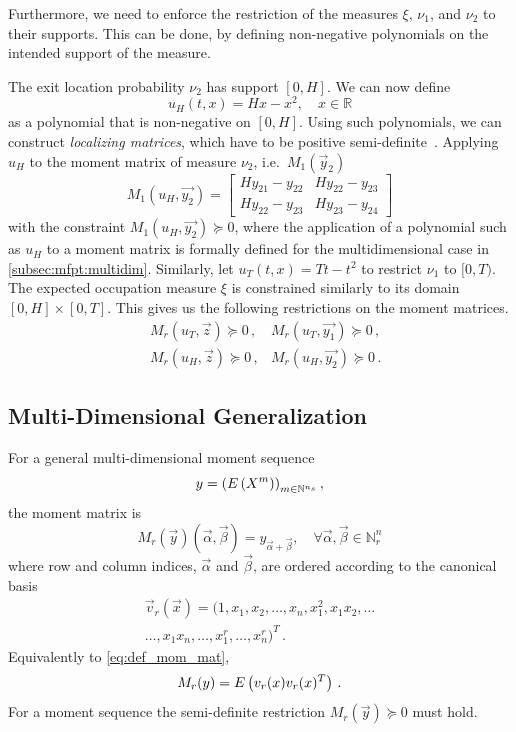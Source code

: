 Furthermore, we need to enforce the restriction of the measures
$\xi$, $\nu_1$, and $\nu_2$
to their supports.
This can be done, by defining non-negative polynomials
on the intended support of the measure.
\begin{example}
  The exit location probability $\nu_2$ has support $[0,H]$. We can now define
  \[
    u_H(t,x) = Hx - x^2, \quad x\in \mathbb R
  \]
  as a polynomial that is non-negative on $[0,H]$.
  Using such polynomials, we can construct \emph{localizing matrices},
  which have to be positive semi-definite~\parencite{lasserre2010moments}.
  Applying $u_H$ to the moment matrix of measure $\nu_2$, i.e.\ $M_1(\vec{y}_2)$
  \[
    M_1(u_H, \vec{y_2})=
    \begin{bmatrix}
      Hy_{21} - y_{22} & Hy_{22} - y_{23} \\
      Hy_{22} - y_{23} & Hy_{23} - y_{24}
    \end{bmatrix}
  \]
  with the constraint $M_1(u_H, \vec{y_2})\succeq 0$, where the application of
  a polynomial such as $u_H$ to a moment matrix
  is formally defined for the multidimensional case in
  \autoref{subsec:mfpt:multidim}.
  Similarly, let $u_T(t, x) = Tt-t^2$ to restrict $\nu_1$ to $[0,T)$.
  The expected occupation measure $\xi$ is constrained similarly to its domain
  $[0,H]\times[0,T]$.
  This gives us the following restrictions on the moment matrices.
  \begin{equation}\label{eq:localizing_sd_constraints}
    \begin{split}
      & M_r(u_T,\vec{z})\succeq 0\,, &M_r(u_T,\vec{y_1})\succeq 0\,,\\
      & M_r(u_H,\vec{z})\succeq 0\,, &M_r(u_H,\vec{y_2})\succeq 0\,.
    \end{split}
  \end{equation}
\end{example}

\subsection{Multi-Dimensional Generalization}
\label{subsec:mfpt:multidim}
For a general multi-dimensional moment sequence
\[
  y={\left({E}\left(X^{m}\right)\right)}_{m\in\mathbb{N}^{n_s}}\,,
\]
the moment
matrix is~\parencite{lasserre2010moments}
\begin{equation}\label{eq:def_mom_mat}
  M_r(\vec y)(\vec\alpha,\vec\beta)
  =y_{\vec\alpha + \vec\beta},\quad\forall\vec{\alpha},
  \vec{\beta}\in\mathbb{N}_r^n
\end{equation}
where row and column indices, $\vec{\alpha}$ and $\vec\beta$, are
ordered according to the canonical basis
\begin{multline}\label{eq:canoncial_basis}
  \vec{v}_r(\vec{x}) =
  (1,x_1,x_2,\dots,x_n,x_1^2,x_1x_2,\dots \\
    \dots, x_1x_n,\dots ,x_1^r,\dots
  ,x_n^r)^T\,.
\end{multline}
Equivalently to \eqref{eq:def_mom_mat},
\[
  M_r(y)={E}\left(v_r (x)v_r(x)^T\right)\,.
\]
For a moment sequence the semi-definite restriction
$M_r(\vec{y})\succeq 0$ must hold.

